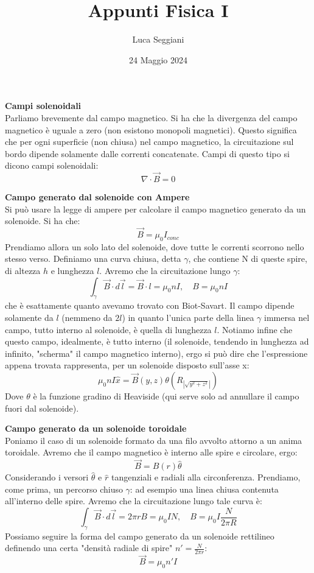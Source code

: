 \documentclass[a4paper,12pt]{article}
\title{Appunti Fisica I}
\author{Luca Seggiani}
\date{24 Maggio 2024}
\begin{document}
\maketitle
\par\smallskip
\textbf{Campi solenoidali} \\
Parliamo brevemente dal campo magnetico. Si ha che la divergenza del campo magnetico è uguale a zero (non esistono monopoli magnetici).
Questo significa che per ogni superficie (non chiusa) nel campo magnetico, la circuitazione sul bordo dipende solamente dalle correnti
concatenate. Campi di questo tipo si dicono campi solenoidali:
$$ \nabla \cdot \vec{B} = 0 $$
\par\smallskip
\textbf{Campo generato dal solenoide con Ampere} \\
Si può usare la legge di ampere per calcolare il campo magnetico generato da un solenoide. Si ha che:
$$ \vec{B} = \mu_0 I_{conc} $$
Prendiamo allora un solo lato del solenoide, dove tutte le correnti scorrono nello stesso verso. Definiamo
una curva chiusa, detta $\gamma$, che contiene N di queste spire, di altezza $h$ e lunghezza $l$. Avremo
che la circuitazione lungo $\gamma$:
$$ \int_\gamma \vec{B} \cdot d\vec{l} = \vec{B} \cdot l = \mu_0 n I, \quad B = \mu_0 n I$$
che è esattamente quanto avevamo trovato con Biot-Savart. Il campo dipende solamente da $l$ (nemmeno da $2l$) in quanto
l'unica parte della linea $\gamma$ immersa nel campo, tutto interno al solenoide, è quella di lunghezza $l$.
Notiamo infine che questo campo, idealmente, è tutto interno (il solenoide, tendendo in lunghezza ad infinito,
"scherma" il campo magnetico interno), ergo si può dire che l'espressione appena trovata rappresenta, per un solenoide
disposto sull'asse x:
$$ \mu_0nI \hat{x} = \vec{B}(y,z)  \theta(R_|\sqrt{y^2+z^2}|)$$
Dove $\theta$ è la funzione gradino di Heaviside (qui serve solo ad annullare il campo fuori dal solenoide).
\par\smallskip
\textbf{Campo generato da un solenoide toroidale} \\
Poniamo il caso di un solenoide formato da una filo avvolto attorno a un anima toroidale. Avremo che il campo magnetico è interno
alle spire e circolare, ergo:
$$ \vec{B} = B(r)\hat{\theta} $$
Considerando i versori $\hat{\theta}$ e $\hat{r}$ tangenziali e radiali alla circonferenza. Prendiamo, come prima, un percorso
chiuso $\gamma$: ad esempio una linea chiusa contenuta all'interno delle spire. Avremo che la circuitazione lungo tale curva è:
$$ \int_\gamma \vec{B} \cdot d\vec{l} = 2\pi r B = \mu_0 I N, \quad B = \mu_0I\frac{N}{2\pi R} $$
Possiamo seguire la forma del campo generato da un solenoide rettilineo definendo una certa "densità radiale di spire" $n' = \frac{N}{2\pi r}$:
$$ \vec{B} = \mu_0 n' I $$
\end{document}
